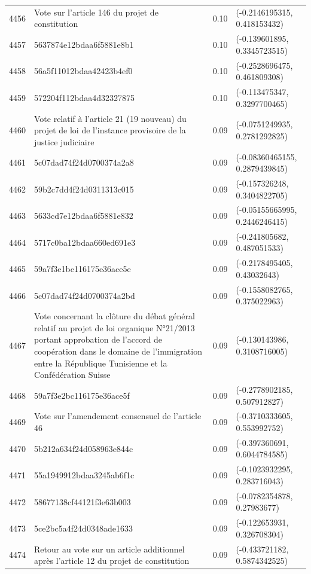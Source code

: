 \begin{table}[ht]
\begin{tabular}{rlrl}
  4456 & Vote sur l'article 146 du projet de constitution & 0.10 & (-0.2146195315, 0.418153432) \\ 
  4457 & 5637874e12bdaa6f5881e8b1 & 0.10 & (-0.139601895, 0.3345723515) \\ 
  4458 & 56a5f11012bdaa42423b4ef0 & 0.10 & (-0.2528696475, 0.461809308) \\ 
  4459 & 572204f112bdaa4d32327875 & 0.10 & (-0.113475347, 0.3297700465) \\ 
  4460 & Vote relatif à l'article 21 (19 nouveau) du projet de loi de l'instance provisoire de la justice judiciaire & 0.09 & (-0.0751249935, 0.2781292825) \\ 
  4461 & 5c07dad74f24d0700374a2a8 & 0.09 & (-0.08360465155, 0.2879439845) \\ 
  4462 & 59b2c7dd4f24d0311313c015 & 0.09 & (-0.157326248, 0.3404822705) \\ 
  4463 & 5633cd7e12bdaa6f5881e832 & 0.09 & (-0.05155665995, 0.2446246415) \\ 
  4464 & 5717c0ba12bdaa660ed691e3 & 0.09 & (-0.241805682, 0.487051533) \\ 
  4465 & 59a7f3e1bc116175e36ace5e & 0.09 & (-0.2178495405, 0.43032643) \\ 
  4466 & 5c07dad74f24d0700374a2bd & 0.09 & (-0.1558082765, 0.375022963) \\ 
  4467 & Vote concernant la clôture du débat général relatif au projet de loi organique N°21/2013 portant approbation de l'accord de coopération dans le domaine de l'immigration entre la République Tunisienne et la Confédération Suisse & 0.09 & (-0.130143986, 0.3108716005) \\ 
  4468 & 59a7f3e2bc116175e36ace5f & 0.09 & (-0.2778902185, 0.507912827) \\ 
  4469 & Vote sur l'amendement consensuel de l'article 46 & 0.09 & (-0.3710333605, 0.553992752) \\ 
  4470 & 5b212a634f24d058963e844c & 0.09 & (-0.397360691, 0.6044784585) \\ 
  4471 & 55a1949912bdaa3245ab6f1c & 0.09 & (-0.1023932295, 0.283716043) \\ 
  4472 & 58677138cf44121f3e63b003 & 0.09 & (-0.0782354878, 0.27983677) \\ 
  4473 & 5ce2bc5a4f24d0348ade1633 & 0.09 & (-0.122653931, 0.326708304) \\ 
  4474 & Retour au vote sur un article additionnel après l'article 12 du projet de constitution & 0.09 & (-0.433721182, 0.5874342525) \\ 

\end{tabular}
\end{table}
